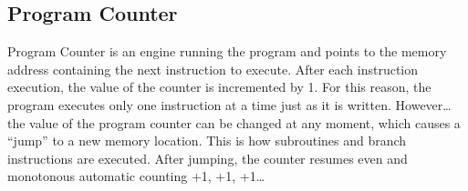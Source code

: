 
\subsection{Program Counter}
Program Counter is an engine running the program and points to the memory address containing the next instruction to execute. After each instruction execution, the value of the counter is incremented by 1. For this reason, the program executes only one instruction at a time just as it is written. However…the value of the program counter can be changed at any moment, which causes a “jump” to a new memory location. This is how subroutines and branch instructions are executed. After jumping, the counter resumes even and monotonous automatic counting +1, +1, +1…



